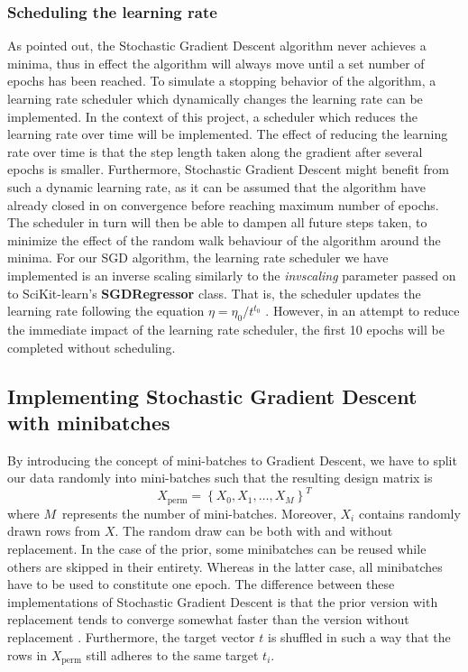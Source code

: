 \documentclass
[twocolumn,
secnumarabic,
nobibnotes,
aps,
prl,
reprint,
groupedaddress,
amsmath,
amssymb
]{revtex4-2}
\begin{document}
\subsubsection{Scheduling the learning rate}
As pointed out, the Stochastic Gradient Descent algorithm never achieves a minima, thus in effect the algorithm will always move until a set number of epochs has been reached. To simulate a stopping behavior of the algorithm, a learning rate scheduler which dynamically changes the learning rate can be implemented. In the context of this project, a scheduler which reduces the learning rate over time will be implemented.
The effect of reducing the learning rate over time is that the step length taken along the gradient after several epochs is smaller. Furthermore, Stochastic Gradient Descent might benefit from such a dynamic learning rate, as it can  be assumed that the algorithm have already closed in on convergence before reaching maximum number of epochs. The scheduler in turn will then be able to dampen all future steps taken, to minimize the effect of the random walk behaviour of the algorithm around the minima.
For our SGD algorithm, the learning rate scheduler we have implemented is an inverse scaling similarly to the \textit{invscaling} parameter passed on to SciKit-learn's \textbf{SGDRegressor} class. That is, the scheduler updates the learning rate following the equation $\eta = \eta_0/t^{t_0}$ \cite{scikit-learn}. However, in an attempt to reduce the immediate impact of the learning rate scheduler, the first 10 epochs will be completed without scheduling.

\subsection{Implementing Stochastic Gradient Descent with minibatches}
By introducing the concept of mini-batches to Gradient Descent, we have to split our data randomly into mini-batches such that the resulting design matrix is
$$
  X_{\text{perm}} = \left\{X_0, X_1, \ldots, X_M\right\}^T
$$
where $M$ represents the number of mini-batches. Moreover, $X_i$ contains randomly drawn rows from $X$. The random draw can be both with and without replacement. In the case of the prior, some minibatches can be reused while others are skipped in their entirety. Whereas in the latter case, all minibatches have to be used to constitute one epoch. The difference between these implementations of Stochastic Gradient Descent is that the prior version with replacement tends to converge somewhat faster than the version without replacement \cite{Geron2019}. Furthermore, the target vector $t$ is shuffled in such a way that the rows in $X_{\text{perm}}$ still adheres to the same target $t_i$.
\end{document}
